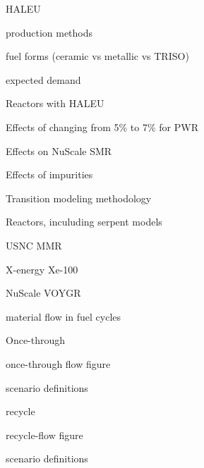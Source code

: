 \documentclass{report}
\begin{document}
\begin{outline}
\begin{outline}
    \item HALEU
    \begin{outline}
        \item production methods
        \item fuel forms (ceramic vs metallic vs TRISO)
        \item expected demand \cite{korsnick_need_2018}
        \item Reactors with HALEU
        \begin{outline}
            \item Effects of changing from 5\% to 7\% for PWR \cite{burns_reactor_2020}
            \item Effects on NuScale SMR \cite{carlson_implications_2022}
            \item Effects of impurities \cite{celikten_effects_2021}
        \end{outline}
    \end{outline}
\end{outline}

\item Transition modeling methodology
\begin{outline}
    \item Reactors, inculuding serpent models
    \begin{outline}
        \item USNC MMR \cite{hussain_advances_2018}
        \item X-energy Xe-100 \cite{harlan_x-energy_2018}
        \item NuScale VOYGR \cite{nuscale_chapter_2020,suk_simulation_2021}
    \end{outline}
    \item material flow in fuel cycles
    \begin{outline}
        \item Once-through
        \begin{outline}
            \item once-through flow figure
            \item scenario definitions
        \end{outline}
        \item recycle 
        \begin{outline}
            \item recycle-flow figure          
            \item scenario definitions
        \end{outline}


\end{outline}
\end{outline}
\end{outline}
\end{document}
